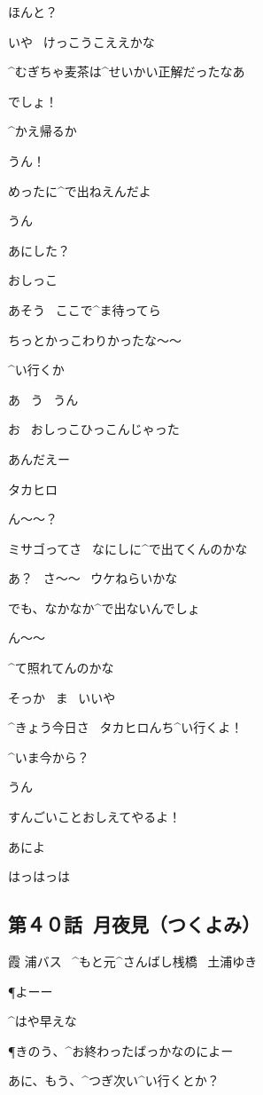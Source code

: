 \M ほんと？

\T いや
\ けっこうこええかな

\page
\T ^{むぎちゃ}{麦茶}は^{せいかい}{正解}だったなあ

\M でしょ！

\page
\T ^{かえ}{帰}るか

\M うん！

\T めったに^{で}{出}ねえんだよ

\M うん

\page
\T あにした？

\M おしっこ

\T あそう
\ ここで^{ま}{待}ってら

\M ちっとかっこわりかったな〜〜

\page[111]
\T ^{い}{行}くか

\M あ
\ う
\ うん

\M お
\ おしっこひっこんじゃった

\T あんだえー

\page
\M タカヒロ

\T ん〜〜？

\M ミサゴってさ
\ なにしに^{で}{出}てくんのかな

\T あ？
\ さ〜〜
\ ウケねらいかな

\M でも、なかなか^{で}{出}ないんでしょ

\T ん〜〜

\T ^{て}{照}れてんのかな

\M そっか
\ ま
\ いいや

\page
\M ^{きょう}{今日}さ
\ タカヒロんち^{い}{行}くよ！

\T ^{いま}{今}から？

\M うん

\M すんごいことおしえてやるよ！

\T あによ

\M はっはっは


\subsection{第４０話\ 月夜見（つくよみ）}

\page[116]
\Sign 霞 浦バス
\ ^{もと}{元}^{さんばし}{桟橋}
\ 土浦ゆき

\page[118]
\P よーー

\Y ^{はや}{早}えな

\page
\P きのう、^{お}{終}わったばっかなのによー

\Y あに、もう、^{つぎ}{次}い^{い}{行}くとか？

